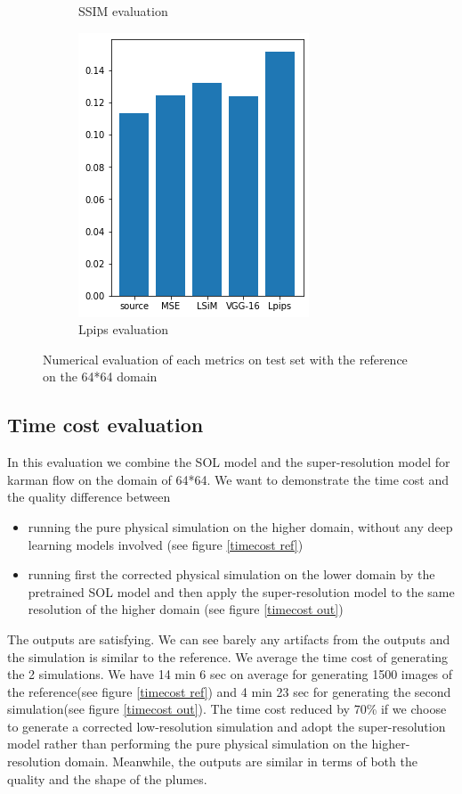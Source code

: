 \documentclass[a4paper,12pt,twoside]{report}
\begin{document}
\begin{figure}
\begin{subfigure}{0.32\textwidth}
			\caption{SSIM evaluation}
		\end{subfigure}
		\begin{subfigure}{0.32\textwidth}
			\centering
			\includegraphics[scale=0.49]{buoyancy_low/lpips_eval.png}
			\caption{Lpips evaluation}
		\end{subfigure}
		\caption{Numerical evaluation of each metrics on test set with the reference on the 64*64 domain}
		\label{sol buoyancy low numeval}
	\end{figure}

\subsection{Time cost evaluation}
In this evaluation we combine the SOL model and the super-resolution model for karman flow on the domain of 64*64. We want to demonstrate the time cost and the quality difference between
\begin{itemize}
	\item running  the pure physical simulation on the higher domain, without any deep learning models involved (see figure \ref{timecost ref})
	\item running first the corrected physical simulation on the lower domain by the pretrained SOL model and then apply the super-resolution model to the same resolution of the higher domain (see figure \ref{timecost out})
\end{itemize}
The outputs are satisfying. We can see barely any artifacts from the outputs and the simulation is similar to the reference. We average the time cost of generating the 2 simulations. We have 14 min 6 sec on average for generating 1500 images of the reference(see figure \ref{timecost ref}) and 4 min 23 sec for generating the second simulation(see figure \ref{timecost out}). The time cost reduced by 70\% if we choose to generate a corrected low-resolution simulation and adopt the super-resolution model rather than performing the pure physical simulation on the higher-resolution domain. Meanwhile, the outputs are similar in terms of both the quality and the shape of the plumes.  
\end{document}
